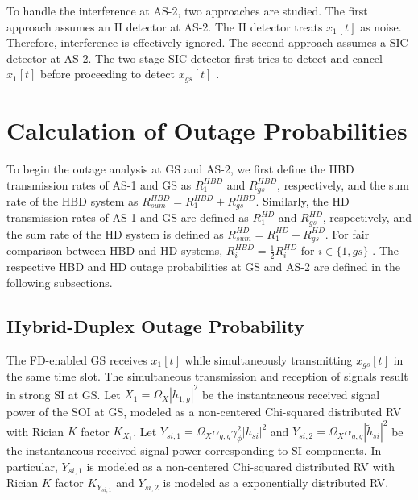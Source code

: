 To handle the interference at AS-2, two approaches are studied. The first approach assumes an II detector at AS-2. The II detector treats $x_1[t]$ as noise. Therefore, interference is effectively ignored. The second approach assumes a SIC detector at AS-2. The two-stage SIC detector first tries to detect and cancel $x_1[t]$ before proceeding to detect $x_{gs}[t]$ \cite{narasimhan2007individual}. 

\section{Calculation of Outage Probabilities} \label{section:outage_prob}
To begin the outage analysis at GS and AS-2, we first define the HBD transmission rates of AS-1 and GS as $R^{HBD}_{1}$ and $R^{HBD}_{gs}$, respectively, and the sum rate of the HBD system as $R^{HBD}_{sum} = R^{HBD}_{1}+R^{HBD}_{gs}$. Similarly, the HD transmission rates of AS-1 and GS are defined as $R^{HD}_{1}$ and $R^{HD}_{gs}$, respectively, and the sum rate of the HD system is defined as $R^{HD}_{sum} = R^{HD}_{1}+R^{HD}_{gs}$. For fair comparison between HBD and HD systems, $R_{i}^{HBD}=\frac{1}{2}R_{i}^{HD}$ for $ i \in \{1, gs\}$ \cite{kwon2010optimal,baranwal2013outage,sofotasios2017full}. The respective HBD and HD outage probabilities at GS and AS-2 are defined in the following subsections.

\subsection{Hybrid-Duplex Outage Probability}
The FD-enabled GS receives $x_1[t]$ while simultaneously transmitting $x_{gs}[t]$ in the same time slot. The simultaneous transmission and reception of signals result in strong SI at GS. Let $X_{1}=\Omega_X|h_{1,g}|^2$ be the instantaneous received signal power of the SOI at GS, modeled as a non-centered Chi-squared distributed RV with Rician $K$ factor $K_{X_{1}}$. Let $Y_{si,1}=\Omega_X\alpha_{g,g}\gamma_{\phi}^2|h_{si}|^2$ and $Y_{si,2}=\Omega_X\alpha_{g,g}|\widetilde{h}_{si}|^2$ be the instantaneous received signal power corresponding to SI components. In particular, $Y_{si,1}$ is modeled as a non-centered Chi-squared distributed RV with Rician $K$ factor $K_{Y_{si,1}}$ and $Y_{si,2}$ is modeled as a exponentially distributed RV.

